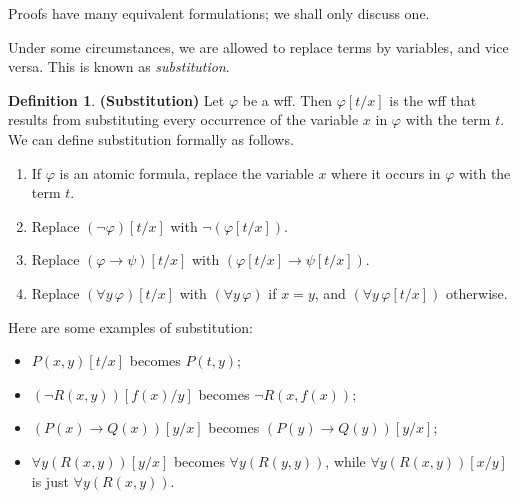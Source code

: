 \documentclass[10pt, a4paper, oneside]{article}
\theoremstyle{definition}
\newtheorem{dfn}[thm]{Definition}
\theoremstyle{remark}
\theoremstyle{plain}
\begin{document}
Proofs have many equivalent formulations; we shall only discuss one.

Under some circumstances, we are allowed to replace terms by variables, and vice
versa. This is known as \emph{substitution}.

\begin{dfn}
    \textbf{(Substitution)}
    Let $\varphi$ be a wff. Then $\varphi[t / x]$ is the wff that results from
    substituting every occurrence of the variable $x$ in $\varphi$ with the term
    $t$. We can define substitution formally as follows.
    
    \begin{enumerate}
        \item If $\varphi$ is an atomic formula, replace the variable $x$ where
            it occurs in $\varphi$ with the term $t$.
        \item Replace $(\neg \varphi) [t / x]$ with $\neg (\varphi [t / x])$.
        \item Replace $(\varphi \rightarrow \psi) [t / x]$ with $(\varphi[t / x]
            \rightarrow \psi[t / x])$.
        \item Replace $(\forall{y} \, \varphi) [t / x]$ with
            $(\forall{y} \, \varphi)$ if $x = y$, and
            $(\forall{y} \, \varphi[t / x])$ otherwise.
    \end{enumerate}
\end{dfn}

Here are some examples of substitution:

\begin{itemize}
    \item $P(x, y)[t / x]$ becomes $P(t, y)$;
    \item $(\neg R(x, y))[f(x) / y]$ becomes $\neg R(x, f(x))$;
    \item $(P(x) \rightarrow Q(x)) [y / x]$ becomes
        $(P(y) \rightarrow Q(y)) [y / x]$;
    \item $\forall{y} (R(x, y)) [y / x]$ becomes $\forall{y} (R(y, y))$, while
        $\forall{y} (R(x, y)) [x / y]$ is just $\forall{y} (R(x, y))$.
\end{itemize}
\end{document}
